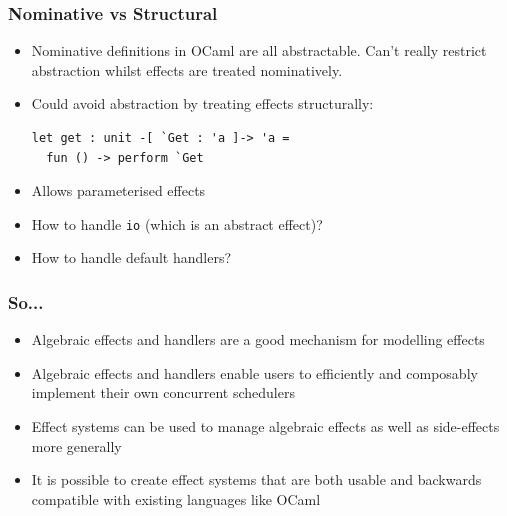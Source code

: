 \documentclass{beamer}
\begin{document}
\begin{frame}[fragile]
\frametitle{Nominative vs Structural}
\begin{itemize}
\item Nominative definitions in OCaml are all abstractable. Can't really
  restrict abstraction whilst effects are treated nominatively.
\item Could avoid abstraction by treating effects structurally:
\begin{lstlisting}[style=ocaml]
let get : unit -[ `Get : 'a ]-> 'a =
  fun () -> perform `Get
\end{lstlisting}
\item Allows parameterised effects
\item How to handle \lstinline[style=ocaml]{io} (which is an abstract effect)?
\item How to handle default handlers?
\end{itemize}
\end{frame}

\begin{frame}
\frametitle{So...}
\begin{itemize}
\item Algebraic effects and handlers are a good mechanism for modelling
  effects
\item Algebraic effects and handlers enable users to efficiently
  and composably implement their own concurrent schedulers
\item Effect systems can be used to manage algebraic effects as well as
  side-effects more generally
\item It is possible to create effect systems that are both usable and
  backwards compatible with existing languages like OCaml
\end{itemize}
\end{frame}
\end{document}
